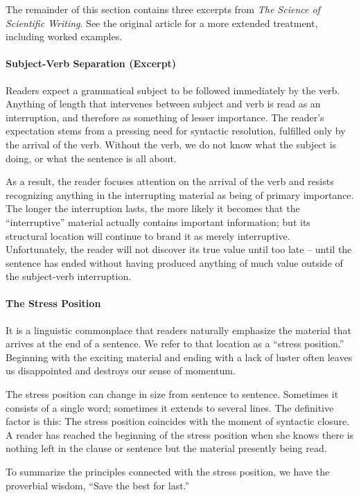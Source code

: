 The remainder of this section contains three excerpts from \emph{The Science of Scientific Writing}. See the original article for a more extended treatment, including worked examples.

\paragraph{Subject-Verb Separation (Excerpt)}

  Readers expect a grammatical subject to be followed immediately by the verb. Anything of length that intervenes between subject and verb is read as an interruption, and therefore as something of lesser importance.
The reader’s expectation stems from a pressing need for syntactic resolution, fulfilled only by the arrival of the verb. Without the verb, we do not know what the subject is doing, or what the sentence is all about.

As a result, the reader focuses attention on the arrival of the verb and resists recognizing anything in the interrupting material as being of primary importance.
The longer the interruption lasts, the more likely it becomes that the “interruptive” material actually contains important information; but its structural location will continue to brand it as merely interruptive.
Unfortunately, the reader will not discover its true value until too late – until the sentence has ended without having produced anything of much value outside of the subject-verb interruption.

\paragraph{The Stress Position}

It is a linguistic commonplace that readers naturally emphasize the material that arrives at the end of a sentence. We refer to that location as a “stress position.”
Beginning with the exciting material and ending with a lack of luster often leaves us disappointed and destroys our sense of momentum.

The stress position can change in size from sentence to sentence. Sometimes it consists of a single word; sometimes it extends to several lines. The definitive factor is this: The stress position coincides with the moment of syntactic closure. A reader has reached the beginning of the stress position when she knows there is nothing left in the clause or sentence but the material presently being read.

To summarize the principles connected with the stress position, we have the proverbial wisdom, “Save the best for last.”


